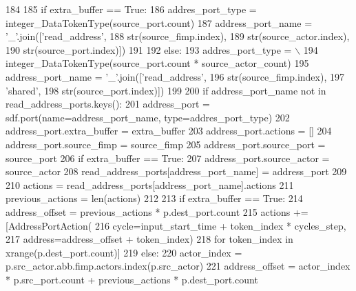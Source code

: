 \begin{DoxyCode}
184 
185             \textcolor{keywordflow}{if} extra\_buffer == \textcolor{keyword}{True}:
186                 addres\_port\_type = integer\_DataTokenType(source\_port.count)
187                 address\_port\_name = \textcolor{stringliteral}{'\_'}.join([\textcolor{stringliteral}{'read\_address'},
188                                               str(source\_fimp.index),
189                                               str(source\_actor.index),
190                                               str(source\_port.index)])
191 
192             \textcolor{keywordflow}{else}:
193                 addres\_port\_type = \(\backslash\)
194                     integer\_DataTokenType(source\_port.count * source\_actor\_count)
195                 address\_port\_name = \textcolor{stringliteral}{'\_'}.join([\textcolor{stringliteral}{'read\_address'},
196                                               str(source\_fimp.index),
197                                               \textcolor{stringliteral}{'shared'},
198                                               str(source\_port.index)])
199 
200             \textcolor{keywordflow}{if} address\_port\_name \textcolor{keywordflow}{not} \textcolor{keywordflow}{in} read\_address\_ports.keys():
201                 address\_port = sdf.port(name=address\_port\_name, type=addres\_port\_type)
202                 address\_port.extra\_buffer = extra\_buffer
203                 address\_port.actions = []
204                 address\_port.source\_fimp = source\_fimp
205                 address\_port.source\_port = source\_port
206                 \textcolor{keywordflow}{if} extra\_buffer == \textcolor{keyword}{True}:
207                     address\_port.source\_actor = source\_actor
208                 read\_address\_ports[address\_port\_name] = address\_port
209 
210             actions = read\_address\_ports[address\_port\_name].actions
211             previous\_actions = len(actions)
212 
213             \textcolor{keywordflow}{if} extra\_buffer == \textcolor{keyword}{True}:
214                 address\_offset = previous\_actions * p.dest\_port.count
215                 actions += [AddressPortAction(
216                     cycle=input\_start\_time + token\_index * cycles\_step,
217                     address=address\_offset + token\_index)
218                     \textcolor{keywordflow}{for} token\_index \textcolor{keywordflow}{in} xrange(p.dest\_port.count)]
219             \textcolor{keywordflow}{else}:
220                 actor\_index = p.src\_actor.abb.fimp.actors.index(p.src\_actor)
221                 address\_offset = actor\_index * p.src\_port.count + previous\_actions * p.dest\_port.count

\end{DoxyCode}
